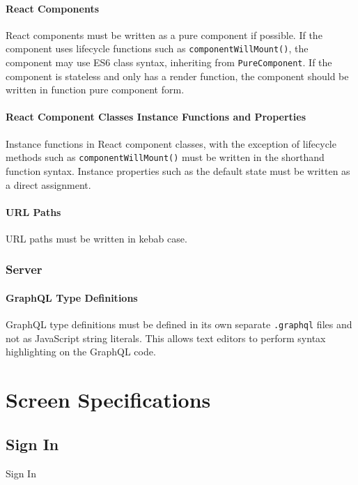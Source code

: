 \paragraph{React Components}
React components must be written as a pure component if possible. If the component uses lifecycle functions such as \texttt{componentWillMount()}, the component may use ES6 class syntax, inheriting from \texttt{PureComponent}. If the component is stateless and only has a render function, the component should be written in function pure component form.

\paragraph{React Component Classes Instance Functions and Properties}
Instance functions in React component classes, with the exception of lifecycle methods such as \texttt{componentWillMount()} must be written in the shorthand function syntax. Instance properties such as the default state must be written as a direct assignment.

\paragraph{URL Paths}
URL paths must be written in kebab case. 

\subsubsection{Server}
\paragraph{GraphQL Type Definitions}
GraphQL type definitions must be defined in its own separate \texttt{.graphql} files and not as JavaScript string literals. This allows text editors to perform syntax highlighting on the GraphQL code.

\pagebreak


\section{Screen Specifications}
    \subsection{Sign In}
     {Sign In}
    
    
